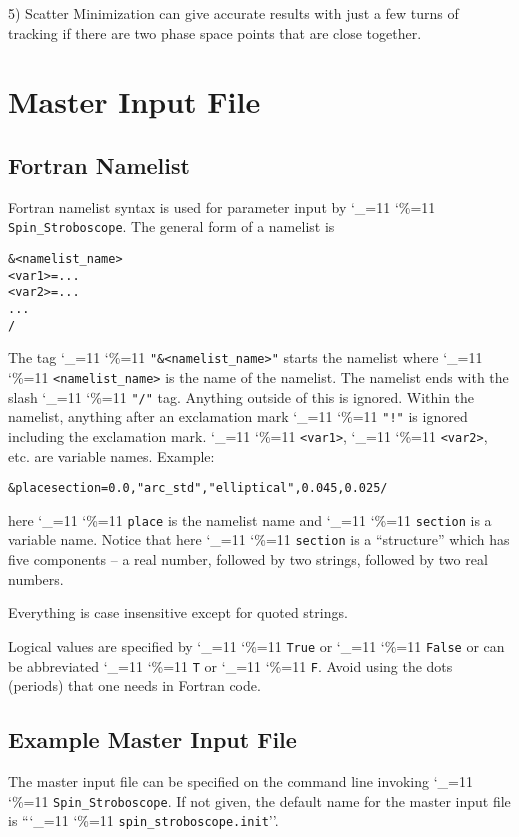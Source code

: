 \documentclass[11pt,openany]{report}
\newcommand\dottcmd[1]{\texttt{#1}\endgroup}
\newcommand{\vn}{\begingroup\catcode`\_=11 \catcode`\%=11 \dottcmd}
\newcommand{\sss}{\vn{Spin_Stroboscope}\xspace}
\newlength{\ExBeg}
\newlength{\ExEnd}
\newenvironment{example}
  {\vspace{\ExBeg} \begin{alltt}}
  {\end{alltt} \vspace{\ExEnd}}
\begin{document}
5) Scatter Minimization can give accurate results with just a few turns of tracking if there are two phase
space points that are close together.

\chapter{Master Input File} 
\label{s:master}

\section{Fortran Namelist}
\label{s:namelist}

Fortran namelist syntax is used for parameter input by \sss. The
general form of a namelist is
\begin{example}
  &<namelist_name>
    <var1> = ...
    <var2> = ...
    ...
  /
\end{example}
The tag \vn{"\&<namelist_name>"} starts the namelist where
\vn{<namelist_name>} is the name of the namelist. The namelist ends
with the slash \vn{"/"} tag. Anything outside of this is
ignored. Within the namelist, anything after an exclamation mark
\vn{"!"} is ignored including the exclamation mark. \vn{<var1>},
\vn{<var2>}, etc. are variable names. Example:
\begin{example}
  &place section =   0.0, "arc_std", "elliptical", 0.045, 0.025 /
\end{example}
here \vn{place} is the namelist name and \vn{section} is a
variable name.  Notice that here \vn{section} is a ``structure'' which
has five components -- a real number, followed by two strings,
followed by two real numbers.

Everything is case insensitive except for quoted strings.

Logical values are specified by \vn{True} or \vn{False} or can be
abbreviated \vn{T} or \vn{F}. Avoid using the dots (periods) that one
needs in Fortran code.

\section{Example Master Input File} 
\label{s:master.example}

The master input file can be specified on the command line invoking \sss.
If not given, the default name for the master input file is ``\vn{spin_stroboscope.init}''.
\end{document}
